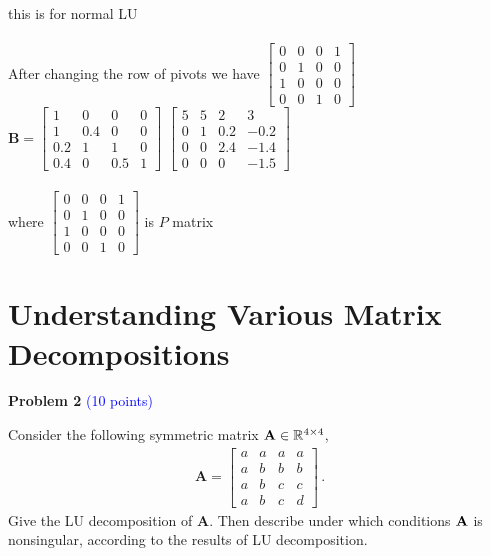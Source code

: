 \documentclass[english,onecolumn]{IEEEtran}
\begin{document}
\begin{enumerate}
      this is for normal LU
      \\\\
      After changing the row of pivots  we have
      $ \begin{bmatrix}
      0 & 0 & 0 & 1  \\
      0 & 1 & 0 & 0\\
      1 & 0 & 0 & 0\\
      0 & 0 & 1 & 0     
      \end{bmatrix}$
      $\mathbf{B}=\begin{bmatrix}
      1 & 0 & 0 & 0  \\
      1 & 0.4 & 0 & 0\\
      0.2 & 1 & 1 & 0\\
      0.4 & 0 & 0.5 & 1     
      \end{bmatrix}$ 
      $\begin{bmatrix}
      5 & 5 & 2 & 3  \\
      0 & 1 & 0.2 & -0.2\\
      0 & 0 & 2.4 & -1.4\\
      0 & 0 & 0 & -1.5     
      \end{bmatrix}$\\\\
      where $ \begin{bmatrix}
      0 & 0 & 0 & 1  \\
      0 & 1 & 0 & 0\\
      1 & 0 & 0 & 0\\
      0 & 0 & 1 & 0     
      \end{bmatrix}$ is $P$ matrix
      
      
      
      
       
\end{enumerate}











\newpage
\section{Understanding Various Matrix Decompositions}
\noindent\textbf{Problem 2} \textcolor{blue}{(10 points)}

\noindent Consider the following symmetric matrix ${\bf A}\in \mathbb{R}^{4\times 4}$,
	\begin{align*}
		\mathbf{A}=
		\begin{bmatrix}
			a&a&a&a\\
			a&b&b&b\\
			a&b&c&c\\
			a&b&c&d
		\end{bmatrix}\,.
	\end{align*}
Give the LU decomposition of $\mathbf{A}$.
Then describe under which conditions $\bf{A}$ is nonsingular, according to the results of LU decomposition.
\end{document}
